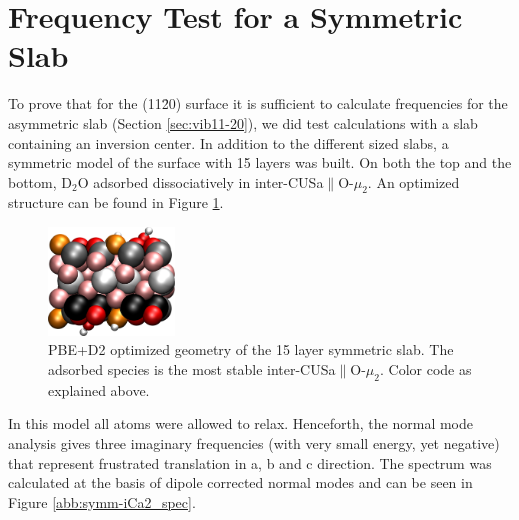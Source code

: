 \documentclass[11pt,DIV=13,BCOR=5mm,a4paper,headinclude]{scrbook}
\begin{document}
\section{Frequency Test for a Symmetric Slab}\label{symmetric_slab}
To prove that for the (11\=20) surface it is sufficient to calculate frequencies for the asymmetric slab (Section \ref{sec:vib11-20}), we did test calculations with a slab containing an inversion center.
In addition to the different sized slabs, a symmetric model of the surface with 15 layers was built.
On both the top and the bottom, D$_2$O adsorbed dissociatively in inter-CUSa$\parallel$O-$\mu_2$.
An optimized structure can be found in Figure \ref{abb:symm-slab}.
 \begin{figure} [!h]
 \centering
 \includegraphics[width=0.3\textwidth]{figures/11-20/side_symmcell_iCa2.png}
  \caption{PBE+D2 optimized geometry of the 15 layer symmetric slab.
The adsorbed species is the most stable inter-CUSa$\parallel$O-$\mu_2$.
Color code as explained above.} 
        \label{abb:symm-slab}
 \end{figure}
In this model all atoms were allowed to relax.
Henceforth, the normal mode analysis gives three imaginary frequencies (with very small energy, yet negative) that represent frustrated translation in a, b and c direction.
The spectrum was calculated at the basis of dipole corrected normal modes and can be seen in Figure \ref{abb:symm-iCa2_spec}.
\end{document}
